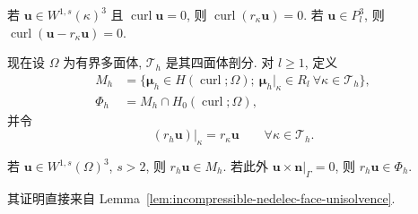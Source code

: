\begin{Remark}\label{rem:incompressible-nedelec-interpolation-curl-zero}
若 $\mathbf u\in W^{1,s}(\kappa)^3$ 且
$\operatorname{curl}\mathbf u=0$, 则
$\operatorname{curl}(r_\kappa\mathbf u)=0$.
若 $\mathbf u\in P_l^3$, 则
$\operatorname{curl}(\mathbf u-r_\kappa\mathbf u)=0$.
\end{Remark}

现在设 $\Omega$ 为有界多面体,
$\mathcal T_h$ 是其四面体剖分. 对 $l\geq1$, 定义
\begin{align}
M_h&=\{\boldsymbol\mu_h\in H(\operatorname{curl};\Omega);
\ \boldsymbol\mu_h|_\kappa\in R_l
\ \forall\kappa\in\mathcal T_h\},
\label{eq:incompressible-nedelec-global-space}\\
\Phi_h&=M_h\cap H_0(\operatorname{curl};\Omega),
\label{eq:incompressible-nedelec-zero-trace-space}
\end{align}
并令
\begin{equation}\label{eq:incompressible-nedelec-global-interpolant}
(r_h\mathbf u)|_\kappa=r_\kappa\mathbf u
\qquad\forall\kappa\in\mathcal T_h.
\end{equation}

\begin{Lemma}\label{lem:incompressible-nedelec-conformity}
若 $\mathbf u\in W^{1,s}(\Omega)^3$, $s>2$, 则
$r_h\mathbf u\in M_h$.
若此外 $\mathbf u\times\mathbf n|_\Gamma=0$, 则
$r_h\mathbf u\in\Phi_h$.
\end{Lemma}
其证明直接来自
Lemma~\ref{lem:incompressible-nedelec-face-unisolvence}.
